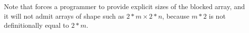 \begin{mathpar}
\end{mathpar}
Note that  forces a programmer to provide explicit sizes
of the blocked array, and it will not admit arrays of shape such as
$2 * m \times 2 * n$, because $m * 2$ is not definitionally equal to $2 * m$.

